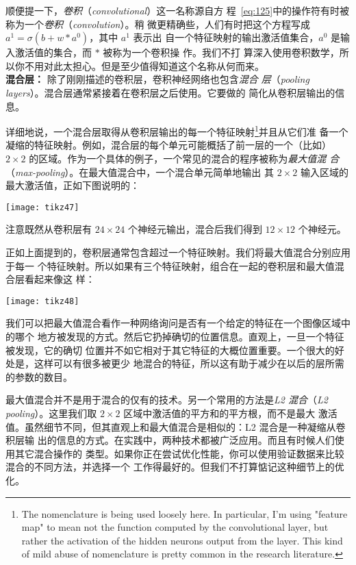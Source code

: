 顺便提一下，\emph{卷积}（\textit{convolutional}）这一名称源自方
程~\eqref{eq:125}中的操作符有时被称为一个\emph{卷积}（\textit{convolution}）。稍
微更精确些，人们有时把这个方程写成 $a^1 = \sigma(b + w * a^0)$，其中 $a^1$ 表示出
自一个特征映射的输出激活值集合，$a^0$ 是输入激活值的集合，而 $*$ 被称为一个卷积操
作。我们不打
算深入使用卷积数学，所以你不用对此太担心。但是至少值得知道这个名称从何而来。\\

\textbf{混合层：} 除了刚刚描述的卷积层，卷积神经网络也包含\emph{混合
  层}（\textit{pooling layers}）。混合层通常紧接着在卷积层之后使用。它要做的
简化从卷积层输出的信息。

详细地说，一个混合层取得从卷积层输出的每一个特征映射\footnote{The
  nomenclature is being used loosely here. In particular, I'm using "feature
  map" to mean not the function computed by the convolutional layer, but rather
  the activation of the hidden neurons output from the layer. This kind of mild
  abuse of nomenclature is pretty common in the research literature.}并且从它们准
备一个凝缩的特征映射。例如，混合层的每个单元可能概括了前一层的一个（比如）$2
\times 2$ 的区域。作为一个具体的例子，一个常见的混合的程序被称为\emph{最大值混
  合}（\textit{max-pooling}）。在最大值混合中，一个混合单元简单地输出
其 $2 \times 2$ 输入区域的最大激活值，正如下图说明的：
\begin{center}
  \texttt{[image: tikz47]}
\end{center}
注意既然从卷积层有 $24 \times 24$ 个神经元输出，混合后我们得到 $12 \times
12$ 个神经元。

正如上面提到的，卷积层通常包含超过一个特征映射。我们将最大值混合分别应用于每一
个特征映射。所以如果有三个特征映射，组合在一起的卷积层和最大值混合层看起来像这
样：
\begin{center}
  \texttt{[image: tikz48]}  
\end{center}

我们可以把最大值混合看作一种网络询问是否有一个给定的特征在一个图像区域中的哪个
地方被发现的方式。然后它扔掉确切的位置信息。直观上，一旦一个特征被发现，它的确切
位置并不如它相对于其它特征的大概位置重要。一个很大的好处是，这样可以有很多被更少
地混合的特征，所以这有助于减少在以后的层所需的参数的数目。

最大值混合并不是用于混合的仅有的技术。另一个常用的方法是\emph{L2 混合}（\textit{L2
    pooling}）。这里我们取 $2 \times 2$ 区域中激活值的平方和的平方根，而不是最大
激活值。虽然细节不同，但其直观上和最大值混合是相似的：L2 混合是一种凝缩从卷积层输
出的信息的方式。在实践中，两种技术都被广泛应用。而且有时候人们使用其它混合操作的
类型。如果你正在尝试优化性能，你可以使用验证数据来比较混合的不同方法，并选择一个
工作得最好的。但我们不打算惦记这种细节上的优化。\\


